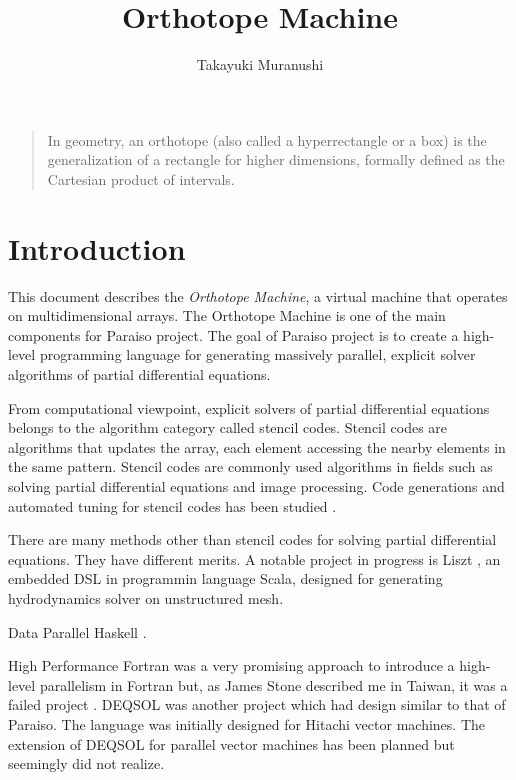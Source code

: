 \documentclass{article}
\title{Orthotope Machine}
\author{Takayuki Muranushi}
\begin{document}
\maketitle
\begin{quote}
  In geometry, an orthotope (also called a hyperrectangle or a box) is
  the generalization of a rectangle for higher dimensions, formally
  defined as the Cartesian product of intervals.
\end{quote}

\section{Introduction}

This document describes the {\em Orthotope Machine}, a virtual machine that
operates on multidimensional arrays. The Orthotope Machine is one of the main
components for Paraiso project. The goal of Paraiso project is to create a
high-level programming language for generating massively parallel, explicit
solver algorithms of partial differential equations.

From computational viewpoint, explicit solvers of partial differential
equations belongs to the algorithm category called stencil codes. Stencil
codes are algorithms that updates the array, each element accessing the nearby
elements in the same pattern. Stencil codes are commonly used algorithms in
fields such as solving partial differential equations and image
processing. Code generations and automated tuning for stencil codes has been
studied \cite[e.g.]{Datta:EECS-2009-177, Datta:2008:SCO:1413370.1413375}.

There are many methods other than stencil codes for solving partial
differential equations. They have different merits. A notable project in
progress is Liszt \cite{Chafi:2010:LVH:1932682.1869527}, an embedded DSL in
programmin language Scala, designed for generating hydrodynamics solver on
unstructured mesh.

Data Parallel Haskell \cite{nested-data-parallelism}.



High Performance Fortran was a very promising approach to introduce a
high-level parallelism in Fortran but, as James Stone described me in Taiwan,
it was a failed project \cite{Kennedy:2007:RFH:1238844.1238851}.
DEQSOL\cite{SAGAWANOBUTOSHI:1989-01-15,Kon'no:1986:AIS:324493.325029} was
another project which had design similar to that of Paraiso. The language was
initially designed for Hitachi vector machines. The extension of DEQSOL for
parallel vector machines has been planned \cite{SagawaNobutoshi:1989-03-15}
but seemingly did not realize.
\end{document}
